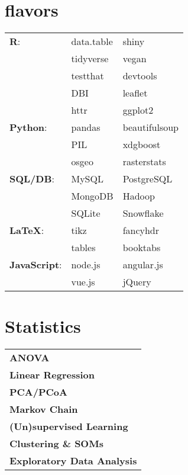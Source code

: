 \documentclass[8pt]{article}
\begin{document}
\begin{minipage}[ht]{.25\linewidth}
   \section*{\faCubes{} flavors}%
   \flushright%
   \footnotesize%
      \begin{tabularx}{\linewidth}{p{.24\linewidth}XX}
         \textbf{R}: & data.table & shiny \\
                     & tidyverse  & vegan \\
                     & testthat   & devtools \\
                     & DBI        & leaflet \\
                     & httr       & ggplot2 \\
         \textbf{Python}: & pandas & beautifulsoup \\
                          & PIL    & xdgboost \\
                          & osgeo  & rasterstats \\
         \textbf{SQL/DB}: & MySQL & PostgreSQL \\
                       & MongoDB & Hadoop \\
                       & SQLite  & Snowflake \\
         \textbf{\LaTeX }:  & tikz   & fancyhdr \\
                           & tables & booktabs \\
         \textbf{JavaScript}: & node.js & angular.js \\
                              & vue.js & jQuery
     \end{tabularx}%
     \flushleft%
   \section*{\faBarChart{} Statistics}%
   \flushright%
   \footnotesize%
    \begin{tabularx}{\linewidth}{X}
      \textbf{ANOVA} \\
      \textbf{Linear Regression} \\
      \textbf{PCA/PCoA} \\
      \textbf{Markov Chain} \\
      \textbf{(Un)supervised Learning} \\
      \textbf{Clustering \& SOMs} \\
      \textbf{Exploratory Data Analysis}%
    \end{tabularx}%
    \flushleft%
\end{minipage}%
\end{document}
